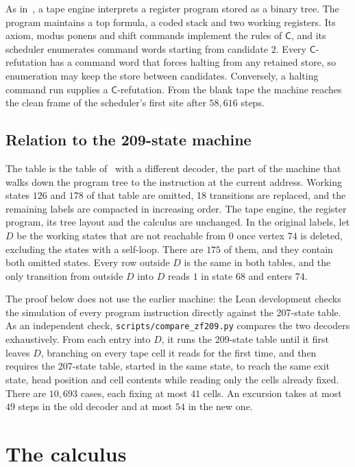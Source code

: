 \documentclass[11pt,letterpaper]{article}
\newcommand{\Cc}{\mathsf{C}}
\newcommand{\file}[1]{\texttt{\nolinkurl{#1}}}
\begin{document}
As in~\cite{pa209,zf209}, a tape engine interprets a register program stored as
a binary tree. The program maintains a top formula, a coded stack and two
working registers. Its axiom, modus ponens and shift commands implement
the rules of $\Cc$, and its scheduler enumerates command words starting
from candidate $2$. Every $\Cc$-refutation has a command word that forces
halting from any retained store, so enumeration may keep the store
between candidates. Conversely, a halting command run supplies a
$\Cc$-refutation. From the blank tape the machine reaches the clean frame
of the scheduler's first site after $58{,}616$ steps.

\subsection*{Relation to the 209-state machine}

The table is the table of~\cite{zf209} with a different decoder, the part
of the machine that walks down the program tree to the instruction at the
current address. Working states $126$ and $178$ of that table are omitted,
18 transitions are replaced, and the remaining labels are compacted in
increasing order. The tape engine, the register program, its tree layout
and the calculus are unchanged. In the original labels, let $D$ be the
working states that are not reachable from $0$ once vertex $74$ is
deleted, excluding the states with a self-loop. There are $175$ of them,
and they contain both omitted states. Every row outside $D$ is the same in
both tables, and the only transition from outside $D$ into $D$ reads $1$
in state $68$ and enters $74$.

The proof below does not use the earlier machine: the Lean development
checks the simulation of every program instruction directly against the
207-state table. As an independent check, \file{scripts/compare_zf209.py}
compares the two decoders exhaustively. From each entry into $D$, it runs
the 209-state table until it first leaves $D$, branching on every tape
cell it reads for the first time, and then requires the 207-state table,
started in the same state, to reach the same exit state, head position and
cell contents while reading only the cells already fixed. There are
$10{,}693$ cases, each fixing at most $41$ cells. An excursion takes at
most $49$ steps in the old decoder and at most $54$ in the new one.

\section{The calculus}\label{sec:calculus}
\end{document}
